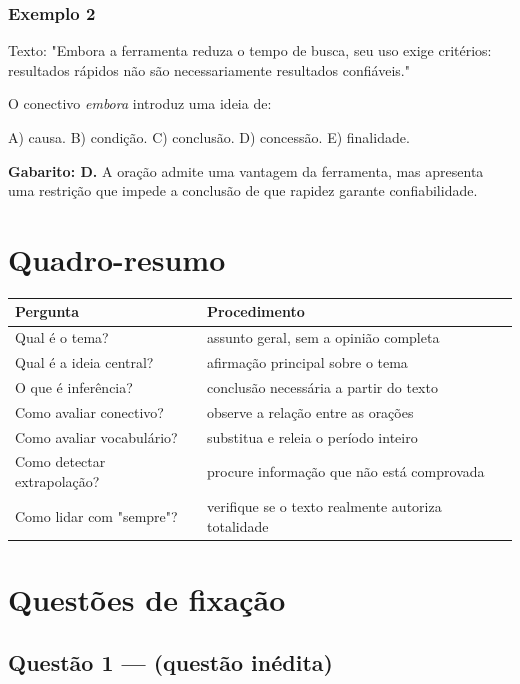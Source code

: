 \documentclass[11pt,a4paper]{article}
\begin{document}
\subsubsection*{Exemplo 2}

Texto: "Embora a ferramenta reduza o tempo de busca, seu uso exige critérios: resultados rápidos não são necessariamente resultados confiáveis."

O conectivo \textit{embora} introduz uma ideia de:

A) causa. B) condição. C) conclusão. D) concessão. E) finalidade.

\begin{alerta}
\textbf{Gabarito: D.} A oração admite uma vantagem da ferramenta, mas apresenta uma restrição que impede a conclusão de que rapidez garante confiabilidade.
\end{alerta}

\section*{Quadro-resumo}

\begin{tabularx}{\linewidth}{lX}
\toprule
 \textbf{Pergunta} & \textbf{Procedimento} \\
\midrule
 Qual é o tema? & assunto geral, sem a opinião completa \\
 Qual é a ideia central? & afirmação principal sobre o tema \\
 O que é inferência? & conclusão necessária a partir do texto \\
 Como avaliar conectivo? & observe a relação entre as orações \\
 Como avaliar vocabulário? & substitua e releia o período inteiro \\
 Como detectar extrapolação? & procure informação que não está comprovada \\
 Como lidar com "sempre"? & verifique se o texto realmente autoriza totalidade \\
\bottomrule
\end{tabularx}


\section*{Questões de fixação}

\subsection*{Questão 1 — (questão inédita)}
\end{document}
